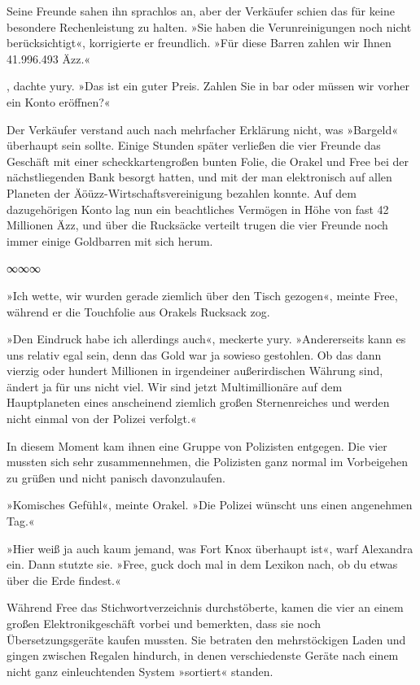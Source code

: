 Seine Freunde sahen ihn sprachlos an, aber der Verkäufer schien das für keine besondere Rechenleistung zu halten. »Sie haben die Verunreinigungen noch nicht berücksichtigt«, korrigierte er freundlich. »Für diese Barren zahlen wir Ihnen 41.996.493 Äzz.«

, dachte yury. »Das ist ein guter Preis. Zahlen Sie in bar oder müssen wir vorher ein Konto eröffnen?«

Der Verkäufer verstand auch nach mehrfacher Erklärung nicht, was »Bargeld« überhaupt sein sollte. Einige Stunden später verließen die vier Freunde das Geschäft mit einer scheckkartengroßen bunten Folie, die Orakel und Free bei der nächstliegenden Bank besorgt hatten, und mit der man elektronisch auf allen Planeten der Äöüzz-Wirtschaftsvereinigung bezahlen konnte. Auf dem dazugehörigen Konto lag nun ein beachtliches Vermögen in Höhe von fast 42 Millionen Äzz, und über die Rucksäcke verteilt trugen die vier Freunde noch immer einige Goldbarren mit sich herum.

\begin{center}
    ∞∞∞
\end{center}

»Ich wette, wir wurden gerade ziemlich über den Tisch gezogen«, meinte Free, während er die Touchfolie aus Orakels Rucksack zog.

»Den Eindruck habe ich allerdings auch«, meckerte yury. »Andererseits kann es uns relativ egal sein, denn das Gold war ja sowieso gestohlen. Ob das dann vierzig oder hundert Millionen in irgendeiner außerirdischen Währung sind, ändert ja für uns nicht viel. Wir sind jetzt Multimillionäre auf dem Hauptplaneten eines anscheinend ziemlich großen Sternenreiches und werden nicht einmal von der Polizei verfolgt.«

In diesem Moment kam ihnen eine Gruppe von Polizisten entgegen. Die vier mussten sich sehr zusammennehmen, die Polizisten ganz normal im Vorbeigehen zu grüßen und nicht panisch davonzulaufen.

»Komisches Gefühl«, meinte Orakel. »Die Polizei wünscht uns einen angenehmen Tag.«

»Hier weiß ja auch kaum jemand, was Fort Knox überhaupt ist«, warf Alexandra ein. Dann stutzte sie. »Free, guck doch mal in dem Lexikon nach, ob du etwas über die Erde findest.«

Während Free das Stichwortverzeichnis durchstöberte, kamen die vier an einem großen Elektronikgeschäft vorbei und bemerkten, dass sie noch Übersetzungsgeräte kaufen mussten. Sie betraten den mehrstöckigen Laden und gingen zwischen Regalen hindurch, in denen verschiedenste Geräte nach einem nicht ganz einleuchtenden System »sortiert« standen.

